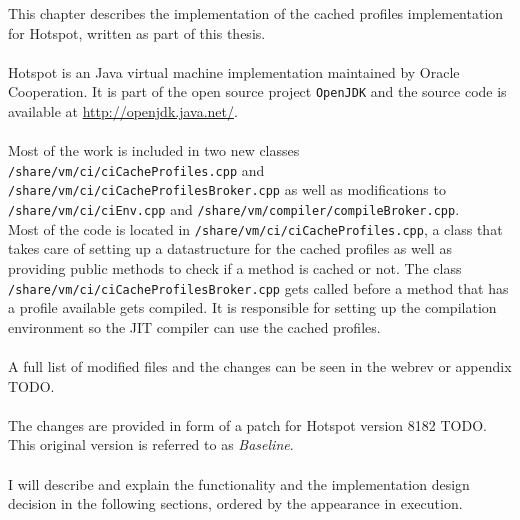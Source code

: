 This chapter describes the implementation of the cached profiles implementation for Hotspot, written as part of this thesis.
\\\\
Hotspot is an Java virtual machine implementation maintained by Oracle Cooperation. It is part of the open source project \texttt{OpenJDK} and the source code is available at \url{http://openjdk.java.net/}.
\\\\
Most of the work is included in two new classes \texttt{/share/vm/ci/ciCacheProfiles.cpp} and \\\texttt{/share/vm/ci/ciCacheProfilesBroker.cpp} as well as modifications to \texttt{/share/vm/ci/ciEnv.cpp} and \texttt{/share/vm/compiler/compileBroker.cpp}.
\\
Most of the code is located in \texttt{/share/vm/ci/ciCacheProfiles.cpp}, a class that takes care of setting up a datastructure for the cached profiles as well as providing public methods to check if a method is cached or not. The class \texttt{/share/vm/ci/ciCacheProfilesBroker.cpp} gets called before a method that has a profile available gets compiled. It is responsible for setting up the compilation environment so the JIT compiler can use the cached profiles.
\\\\
A full list of modified files and the changes can be seen in the webrev or appendix TODO.
\\\\
The changes are provided in form of a patch for Hotspot version 8182 TODO. This original version is referred to as \textit{Baseline}.
\\\\
I will describe and explain the functionality and the implementation design decision in the following sections, ordered by the appearance in execution.


